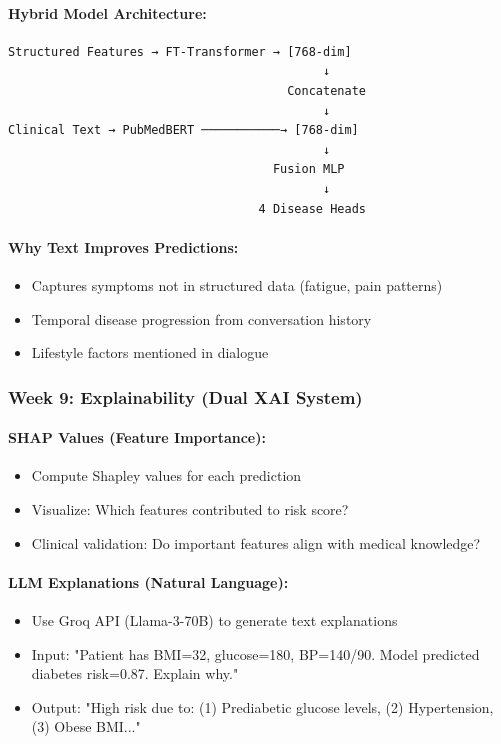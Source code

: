 \documentclass[12pt,a4paper]{article}
\begin{document}
\paragraph{Hybrid Model Architecture:}
\begin{verbatim}
Structured Features → FT-Transformer → [768-dim]
                                            ↓
                                       Concatenate
                                            ↓
Clinical Text → PubMedBERT ───────────→ [768-dim]
                                            ↓
                                     Fusion MLP
                                            ↓
                                   4 Disease Heads
\end{verbatim}

\paragraph{Why Text Improves Predictions:}
\begin{itemize}
    \item Captures symptoms not in structured data (fatigue, pain patterns)
    \item Temporal disease progression from conversation history
    \item Lifestyle factors mentioned in dialogue
\end{itemize}

\subsubsection{Week 9: Explainability (Dual XAI System)}

\paragraph{SHAP Values (Feature Importance):}
\begin{itemize}
    \item Compute Shapley values for each prediction
    \item Visualize: Which features contributed to risk score?
    \item Clinical validation: Do important features align with medical knowledge?
\end{itemize}

\paragraph{LLM Explanations (Natural Language):}
\begin{itemize}
    \item Use Groq API (Llama-3-70B) to generate text explanations
    \item Input: "Patient has BMI=32, glucose=180, BP=140/90. Model predicted diabetes risk=0.87. Explain why."
    \item Output: "High risk due to: (1) Prediabetic glucose levels, (2) Hypertension, (3) Obese BMI..."
\end{itemize}
\end{document}
